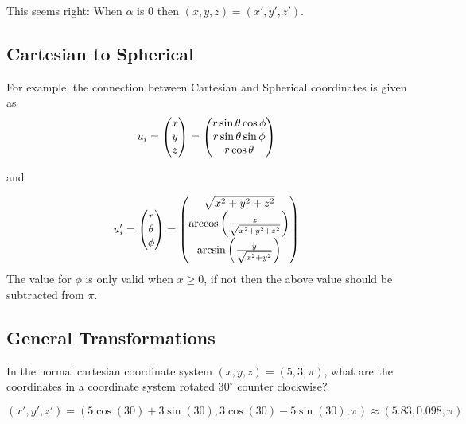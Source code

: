 This seems right: When $\alpha$ is $0$ then $(x,y,z)=(x',y',z')$. 



\subsection{Cartesian to Spherical}
For example, the connection between Cartesian and Spherical coordinates is given as
$$
    u_i = \begin{pmatrix} x \\  y \\ z \end{pmatrix} = \begin{pmatrix} r\sin\theta\cos\phi \\ r\sin\theta\sin\phi \\ r\cos\theta \end{pmatrix}
$$

and

$$
    u'_i = \begin{pmatrix} r \\ \theta \\ \phi \end{pmatrix} 
         = \begin{pmatrix} \sqrt{x^2 + y^2 + z^2} \\ \arccos\left(\frac{z}{\sqrt{x^2 + y^2 + z^2}}\right) \\ \arcsin\left(\frac{y}{\sqrt{x^2+y^2}}\right) \end{pmatrix}
$$
The value for $\phi$ is only valid when $x \ge 0$, if not then the above value should be subtracted from $\pi$.

\subsection{General Transformations}




\myhrule
\begin{myex}
In the normal cartesian coordinate system $(x,y,z) = (5, 3, \pi)$, what are the coordinates in 
a coordinate system rotated $30^\circ$ counter clockwise?

$(x',y',z') = (5\cos(30)+3\sin(30), 3\cos(30) - 5\sin(30), \pi) \approx (5.83,0.098,\pi)$
\end{myex}
